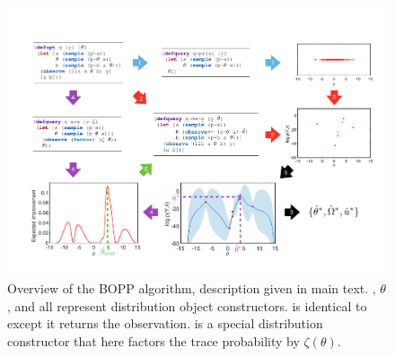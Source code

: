 \begin{figure}[t]
	\centering
	\includegraphics[width=\textwidth]{"bopp_overview_figure"}
	\caption{
		\label{fig:bopp_overview}
		Overview of the BOPP algorithm, description given in main text. , $\theta$,  and  all represent distribution object constructors.
		 is identical to  except it returns the observation.  is a special distribution constructor that here factors the trace probability by $\zeta(\theta)$. }
\end{figure}

